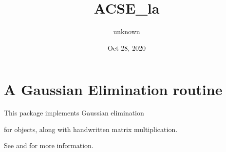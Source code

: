 \documentclass[letterpaper,10pt,english]{sphinxmanual}
\title{ACSE\_la}
\date{Oct 28, 2020}
\author{unknown}
\begin{document}
\pagestyle{empty}
\sphinxmaketitle
\pagestyle{plain}
\sphinxtableofcontents
\pagestyle{normal}
\label{\detokenize{index::doc}}



\chapter{A Gaussian Elimination routine}
\label{\detokenize{index:a-gaussian-elimination-routine}}
This package implements Gaussian elimination %
\begin{footnote}[1]\sphinxAtStartFootnote
{}
%
\end{footnote} for  objects, along with hand\sphinxhyphen{}written matrix multiplication.

See {\hyperref[\detokenize{index:acse_la.gauss}]{}} and  for more information.

\label{\detokenize{index:module-acse_la}}
\end{document}
